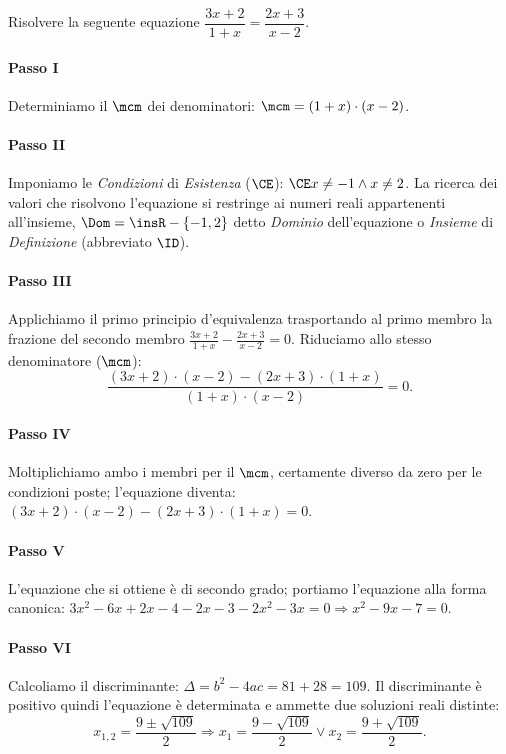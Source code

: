 \begin{exrig}
\begin{esempio}
Risolvere la seguente equazione $\dfrac{3 x + 2}{1 + x}=\dfrac{2 x + 3}{x - 2}$.
 \paragraph{Passo I} Determiniamo il $\mcm$ dei denominatori: $\mcm = ( 1 + x ) 
\cdot ( x - 2 )$.
 \paragraph{Passo II} Imponiamo le \emph{Condizioni} di \emph{Esistenza} 
($\CE$): $\CE x \neq - 1 \wedge x \neq 2$. La ricerca dei valori che risolvono 
l'equazione si restringe ai numeri reali appartenenti all'insieme, $\Dom = \insR 
- \{- 1, 2 \}$ detto \emph{Dominio} dell'equazione o \emph{Insieme} di 
\emph{Definizione} (abbreviato $\ID$).
 \paragraph{Passo III} Applichiamo il primo principio d'equivalenza trasportando 
al primo membro la frazione del secondo membro $\frac{3 x + 2}{1 + x} - \frac{2 
x + 3}{x - 2} = 0$. Riduciamo allo stesso denominatore ($\mcm$): 
\[\frac{( 3 x + 2 ) \cdot ( x - 2 ) - ( 2 x + 3 ) \cdot ( 1 + x )}{( 1 +x ) 
\cdot ( x - 2 )}=0.\]
 \paragraph{Passo IV} Moltiplichiamo ambo i membri per il $\mcm$, certamente 
diverso da zero per le condizioni poste; l'equazione diventa: $( 3 x + 2 ) \cdot 
( x - 2 ) - ( 2 x + 3 ) \cdot ( 1 + x )=0$.
 \paragraph{Passo V} L'equazione che si ottiene è di secondo grado; portiamo 
l'equazione alla forma canonica: $3 x^{2} - 6 x + 2 x - 4 - 2 x - 3 - 2 x^{2} - 
3 x=0 \Rightarrow x^{2} - 9 x - 7=0$.
 \paragraph{Passo VI} Calcoliamo il discriminante: $\Delta=b^{2} - 4 a c=81 + 28 
= 109$. Il discriminante è positivo quindi l'equazione è determinata e ammette 
due soluzioni reali distinte: 
\[x_{1,2}=\frac{9 \pm \sqrt{109}}{2} \Rightarrow x_{1}=\frac{9 - \sqrt{109}}{2} 
\vee x_{2}=\frac{9 + \sqrt{109}}{2}.\]

\end{esempio}
\end{exrig}
